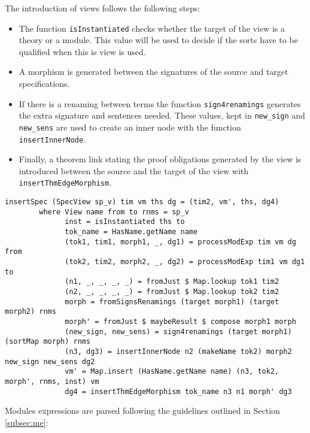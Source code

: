 The introduction of views follows the following steps:

\begin{itemize}
\item The function \verb"isInstantiated" checks whether the target of the
view is a theory or a module. This value will be used to decide if the
sorts have to be qualified when this is view is used.
\item A morphism is generated between the signatures of the source and
target specifications.
\item If there is a renaming between terms the function \verb"sign4renamings"
generates the extra signature and sentences needed. These values, kept in
\verb"new_sign" and \verb"new_sens" are used to create an inner node with
the function \verb"insertInnerNode".
\item Finally, a theorem link stating the proof obligations generated by
the view is introduced between the source and the target of the view with
\verb"insertThmEdgeMorphism".
\end{itemize}

{\codesize
\begin{verbatim}
insertSpec (SpecView sp_v) tim vm ths dg = (tim2, vm', ths, dg4)
        where View name from to rnms = sp_v
              inst = isInstantiated ths to
              tok_name = HasName.getName name
              (tok1, tim1, morph1, _, dg1) = processModExp tim vm dg from
              (tok2, tim2, morph2, _, dg2) = processModExp tim1 vm dg1 to
              (n1, _, _, _, _) = fromJust $ Map.lookup tok1 tim2
              (n2, _, _, _, _) = fromJust $ Map.lookup tok2 tim2
              morph = fromSignsRenamings (target morph1) (target morph2) rnms
              morph' = fromJust $ maybeResult $ compose morph1 morph
              (new_sign, new_sens) = sign4renamings (target morph1) (sortMap morph) rnms
              (n3, dg3) = insertInnerNode n2 (makeName tok2) morph2 new_sign new_sens dg2
              vm' = Map.insert (HasName.getName name) (n3, tok2, morph', rnms, inst) vm
              dg4 = insertThmEdgeMorphism tok_name n3 n1 morph' dg3
\end{verbatim}
}

Modules expressions are parsed following the guidelines outlined in
Section \ref{subsec:me}:

